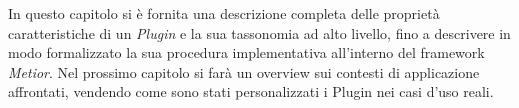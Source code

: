 In questo capitolo si è fornita una descrizione completa delle
proprietà caratteristiche di un \emph{Plugin} e la sua tassonomia ad alto livello, fino a descrivere in modo formalizzato
la sua procedura implementativa all'interno del framework \emph{Metior}.
Nel prossimo capitolo si farà un overview sui contesti di applicazione affrontati, vendendo
come sono stati personalizzati i Plugin nei casi d'uso reali.

